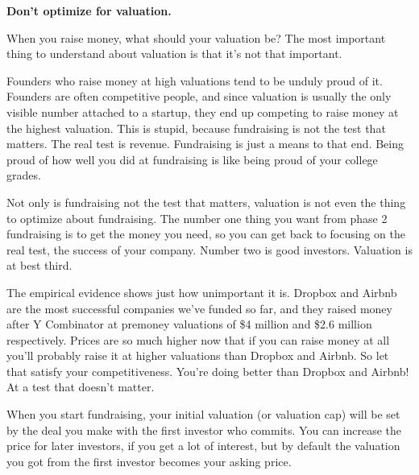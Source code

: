                     \textbf{Don't optimize for valuation.}

When you
                    raise money, what should your valuation be? The most
                    important thing to understand about valuation is that it's
                    not that important.

Founders who raise money at
                    high valuations tend to be unduly proud of it. Founders are
                    often competitive people, and since valuation is usually the
                    only visible number attached to a startup, they end up
                    competing to raise money at the highest valuation. This is
                    stupid, because fundraising is not the test that matters.
                    The real test is revenue. Fundraising is just a means to
                    that end. Being proud of how well you did at fundraising is
                    like being proud of your college grades.

Not only
                    is fundraising not the test that matters, valuation is not
                    even the thing to optimize about fundraising. The number one
                    thing you want from phase 2 fundraising is to get the money
                    you need, so you can get back to focusing on the real test,
                    the success of your company. Number two is good investors.
                    Valuation is at best third.

The empirical
                    evidence shows just how unimportant it is. Dropbox and
                    Airbnb are the most successful companies we've funded so
                    far, and they raised money after Y Combinator at premoney
                    valuations of \$4 million and \$2.6 million respectively.
                    Prices are so much higher now that if you can raise money at
                    all you'll probably raise it at higher valuations than
                    Dropbox and Airbnb. So let that satisfy your
                    competitiveness. You're doing better than Dropbox and
                    Airbnb! At a test that doesn't matter.

When you
                    start fundraising, your initial valuation (or valuation cap)
                    will be set by the deal you make with the first investor who
                    commits. You can increase the price for later investors, if
                    you get a lot of interest, but by default the valuation you
                    got from the first investor becomes your asking price.

